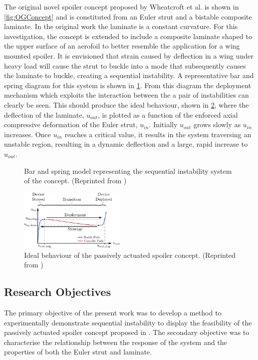 \documentclass{IEEEtran}
\begin{document}
		The original novel spoiler concept proposed by Wheatcroft et al. is shown in \cref{fig:OGConcept} and is constituted from an Euler strut and a bistable composite laminate. In the original work the laminate is a constant curvature. For this investigation, the concept is extended to include a composite laminate shaped to the upper surface of an aerofoil to better resemble the application for a wing mounted spoiler. It is envisioned that strain caused by deflection in a wing under heavy load will cause the strut to buckle into a mode that subsequently causes the laminate to buckle, creating a sequential instability. A representative bar and spring diagram for this system is shown in \cref{fig:BarNSpring}. From this diagram the deployment mechanism which exploits the  interaction between the a pair of instabilities can clearly be seen. This should produce the ideal behaviour, shown in \cref{fig:DesiredPath}, where the deflection of the laminate, $u_{out}$, is plotted as a function of the enforced axial compressive deformation of the Euler strut, $u_{in}$. Initially $u_{out}$ grows slowly as $u_{in}$ increases. Once $u_{in}$  reaches a critical value, it results in the system traversing an unstable region, resulting in a dynamic deflection and a large, rapid increase to $u_{out}$.

		\begin{figure}[!h]
			\centering
			
			\caption{\centering Bar and spring model representing the sequential instability system of the concept. (Reprinted from \cite{Wheatcroft_2023})}
			\label{fig:BarNSpring}
		\end{figure}
	
		\begin{figure}[!h]
			\centering
			\includegraphics[width=0.45\textwidth]{IntroductionImages/Desired_Path_V4.png}
			\caption{\centering Ideal behaviour of the passively actuated spoiler concept. (Reprinted from \cite{Wheatcroft_2023})}
			\label{fig:DesiredPath}
		\end{figure}
       
	  \subsection{Research Objectives}
        The primary objective of the present work was to develop a method to experimentally demonstrate sequential instability to display the feasibility of the passively actuated spoiler concept proposed in \cite{Wheatcroft_2023}. The secondary objective was to characterise the relationship between the response of the system and the properties of both the Euler strut and laminate. 
   
\end{document}
